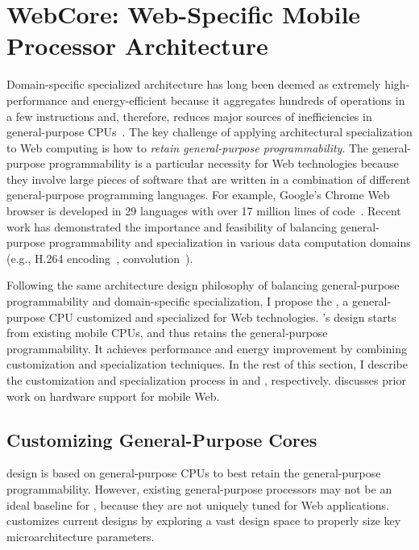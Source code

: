 
\chapter{WebCore: Web-Specific Mobile Processor Architecture}
\label{sec:arch}

Domain-specific specialized architecture has long been deemed as extremely high-performance and energy-efficient because it aggregates hundreds of operations in a few instructions and, therefore, reduces major sources of inefficiencies in general-purpose CPUs~\cite{h264, soda, anysp}. The key challenge of applying architectural specialization to Web computing is how to \textit{retain general-purpose programmability}. The general-purpose programmability is a particular necessity for Web technologies because they involve large pieces of software that are written in a combination of different general-purpose programming languages. For example, Google's Chrome Web browser is developed in 29 languages with over 17 million lines of code~\cite{chromeloc}. Recent work has demonstrated the importance and feasibility of balancing general-purpose programmability and specialization in various data computation domains (e.g., H.264 encoding~\cite{h264}, convolution~\cite{ce}).

Following the same architecture design philosophy of balancing general-purpose programmability and domain-specific specialization, I propose the \webcore, a general-purpose CPU customized and specialized for Web technologies. \webcore's design starts from existing mobile CPUs, and thus retains the general-purpose programmability. It achieves performance and energy improvement by combining customization and specialization techniques. In the rest of this section, I describe the customization and specialization process in  and , respectively.  discusses prior work on hardware support for mobile Web.

\section{Customizing General-Purpose Cores}
\label{sec:arch:customization}

\webcore design is based on general-purpose CPUs to best retain the general-purpose programmability. However, existing general-purpose processors may not be an ideal baseline for \webcore, because they are not uniquely tuned for Web applications. \webcore customizes current designs by exploring a vast design space to properly size key microarchitecture parameters.

